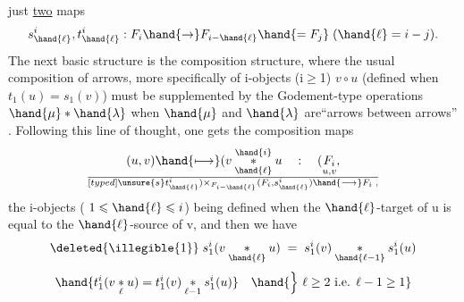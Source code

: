 just \uline{two} maps
\[ s^i_{\hand{\ell}} , t^i_{\hand{\ell}} : F_i \hand{\rightarrow} F_{i-\hand{\ell}} \hand{= F_j} \; ( \hand{\ell} = i-j ) . \]
The next basic structure is the composition structure,  where the usual
composition of arrows,  more specifically of i-objects (i$\geq$1)  $v \circ u$
(defined when $t_1(u)=s_1(v)$)  must be supplemented by the Godement-type
operations $\hand{\mu} * \hand{\lambda}$ when $\hand{\mu}$ and $\hand{\lambda}$ are``arrows between arrows''\hand{,} .  Following
this line of thought,  one gets the composition maps
\[ (u,v) \hand{\longmapsto} ( v \overset{\hand{i}}{\underset{\hand{\ell}}{*}} u \quad : \quad (\underset{u,v}{F_i}, \over[typed]{\unsure{s}}{t}^i_{\hand{\ell}}) \times_{F_{i-\hand{\ell}}} (F_i, s^i_{\hand{\ell}}) \hand{\longrightarrow} F_i \; , \]
the    i-objects ( $1 \leqslant \hand{\ell} \leqslant i$)  being defined when the
$\hand{\ell}$-target of u is equal to the $\hand{\ell}$-source of v,  and then we have
\[ \deleted{\illegible{1}} \; s^i_1(v \underset{\hand{\ell}}{*} u) \; = \; s^i_1(v) \underset{\hand{\ell-1}}{*} s^i_1(u) \]
\[ \hand{t^i_1(v \underset{\ell}{*} u) = t^i_1(v) \underset{\ell-1}{*} s^i_1(u)} \quad \hand{\Big\}\ \ell \geq 2 \text{ i.e. } \ell-1 \geq 1} \]

